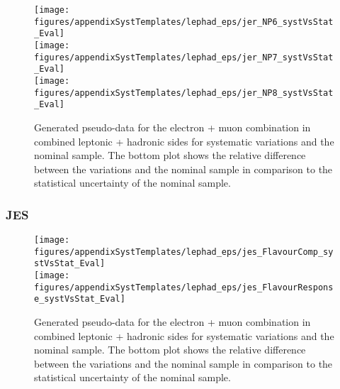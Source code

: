 \begin{figure}[!hb]
\begin{center}
        \texttt{[image: figures/appendixSystTemplates/lephad\_eps/jer\_NP6\_systVsStat\_Eval]}\\
        \texttt{[image: figures/appendixSystTemplates/lephad\_eps/jer\_NP7\_systVsStat\_Eval]}\\
        \texttt{[image: figures/appendixSystTemplates/lephad\_eps/jer\_NP8\_systVsStat\_Eval]}\\
\caption{Generated pseudo-data for the electron + muon combination in combined leptonic + hadronic sides for systematic variations and the nominal \ttbar sample. The bottom plot shows the relative difference between the variations and the nominal sample in comparison to the statistical uncertainty of the nominal sample.}   
\label{fig:systematicVar_lephad_JER_1_4}
\end{center}
\end{figure}


\subsubsection{JES}

\begin{figure}[!hb]
\begin{center}
        \texttt{[image: figures/appendixSystTemplates/lephad\_eps/jes\_FlavourComp\_systVsStat\_Eval]}\\
        \texttt{[image: figures/appendixSystTemplates/lephad\_eps/jes\_FlavourResponse\_systVsStat\_Eval]}\\
\caption{Generated pseudo-data for the electron + muon combination in combined leptonic + hadronic sides for systematic variations and the nominal \ttbar sample. The bottom plot shows the relative difference between the variations and the nominal sample in comparison to the statistical uncertainty of the nominal sample.}   
\label{fig:systematicVar_lephad_JES_1_1}
\end{center}
\end{figure}

